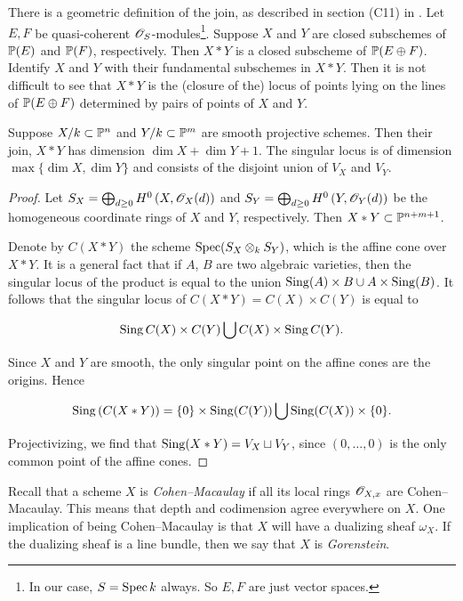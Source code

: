 There is a geometric definition of the join, as described in section (C11) in \cite{altman_joins}. Let $E,F$ be quasi-coherent $\OO_S$-modules\footnote{In our case, $S=\Spec k$  always. So $E,F$ are just vector spaces.}. Suppose $X$ and $Y$ are closed subschemes of $\P(E)$ and $\P(F)$, respectively. Then $X\ast Y$ is a closed subscheme of $\P(E \oplus F)$. Identify $X$ and $Y$ with their fundamental subschemes in $X \ast Y$. Then it is not difficult to see that $X \ast Y$ is the (closure of the) locus of points lying on the lines of $\P(E \oplus F)$ determined by pairs of points of $X$ and $Y$. 

\begin{proposition}
\label{lemma:join}
Suppose $X/k \subset \P^n$ and $Y/k \subset \P^m$ are smooth projective schemes. Then their join, $X \ast Y$ has dimension $\dim X+\dim Y+1$. The singular locus is of dimension $\max\{\dim X,\dim Y\}$ and consists of the disjoint union of $V_X$ and $V_Y$.
\end{proposition}
\begin{proof}
Let $S_X = \bigoplus_{d \geq 0} H^0\left(X,\OO_X(d)\right)$ and $S_Y = \bigoplus_{d \geq 0} H^0\left(Y,\OO_Y(d)\right)$ be the homogeneous coordinate rings of $X$ and $Y$, respectively. Then $X \ast Y \subset \P^{n+m+1}$. 

Denote by $C(X \ast Y)$ the scheme $\Spec (S_X \otimes_k S_Y)$, which is the affine cone over $X \ast Y$. It is a general fact that if $A$, $B$ are two algebraic varieties, then the singular locus of the product is equal to the union $\Sing (A) \times B \cup A \times \Sing(B)$. It follows that the singular locus of $C(X \ast Y) = C(X) \times C(Y)$ is equal to

\[
\Sing C(X) \times C(Y) \bigcup C(X) \times \Sing C(Y).
\]

Since $X$ and $Y$ are smooth, the only singular point on the affine cones are the origins. Hence

$$
\Sing\left(C(X \ast Y)\right) = \{0\} \times \Sing(C(Y)) \bigcup \Sing(C(X)) \times \{ 0\}.
$$

Projectivizing, we find that $\Sing(X \ast Y) = V_X \sqcup V_Y$, since $(0,\ldots,0)$ is the only common point of the affine cones. 
\end{proof}

Recall that a scheme $X$ is \emph{Cohen--Macaulay} if all its local rings $\OO_{X,x}$ are Cohen--Macaulay. This means that depth and codimension agree everywhere on $X$. One implication of being Cohen--Macaulay is that $X$ will have a dualizing sheaf $\omega_X$. If the dualizing sheaf is a line bundle, then we say that $X$ is \emph{Gorenstein}.


